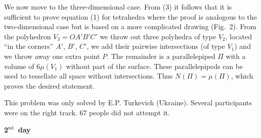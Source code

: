 \documentclass[12pt]{amsart}
\newcommand{\nd}{$^\text{nd}$~}
\begin{document}
\begin{enumerate}
We now move to the three-dimensional case.
From (3) it follows that it is sufficient to prove equation (1) for tetrahedra
where the proof is analogous to the two-dimensional case but is based on a more
complicated drawing (Fig.~2).
From the polyhedron $V_3=OA'B'C'$ we throw out three polyhedra of type $V_2$,
located ``in the corners'' $A'$, $B'$, $C'$, we add their pairwise intersections
(of type $V_1$) and we throw away one extra point $P$.
The remainder is a parallelepiped $\Pi$ with a volume of $6\mu(V_1)$ without
part of the surface.
These parallelepipeds can be used to tessellate all space without intersections.
Thus $N(\Pi)=\mu(\Pi)$, which proves the desired statement.

This problem was only solved by E.P. Turkevich (Ukraine).
Several participants were on the right track.
67 people did not attempt it.\\
\end{enumerate}

\centerline{\textbf{2\nd day}}
\end{document}
